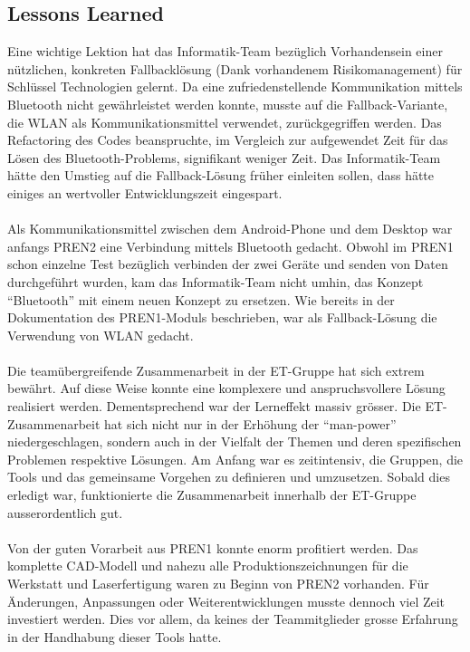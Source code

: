 \subsection{Lessons Learned}
Eine wichtige Lektion hat das Informatik-Team bezüglich Vorhandensein einer nützlichen, 
konkreten Fallbacklösung (Dank vorhandenem Risikomanagement) für Schlüssel Technologien gelernt. 
Da eine zufriedenstellende Kommunikation mittels Bluetooth nicht gewährleistet werden konnte, 
musste auf die Fallback-Variante, die WLAN als Kommunikationsmittel verwendet, zurückgegriffen werden. 
Das Refactoring des Codes beanspruchte, im Vergleich zur aufgewendet Zeit für das Lösen des Bluetooth-Problems, 
signifikant weniger Zeit. Das Informatik-Team hätte den Umstieg auf die Fallback-Lösung früher einleiten sollen, 
dass hätte einiges an wertvoller Entwicklungszeit eingespart.
\\
\\
Als Kommunikationsmittel zwischen dem Android-Phone und dem Desktop war anfangs PREN2 eine Verbindung 
mittels Bluetooth gedacht. Obwohl im PREN1 schon einzelne Test bezüglich verbinden der zwei Geräte und 
senden von Daten durchgeführt wurden, kam das Informatik-Team nicht umhin, das Konzept \enquote{Bluetooth} mit einem neuen 
Konzept zu ersetzen. Wie bereits in der Dokumentation des PREN1-Moduls beschrieben, war als Fallback-Lösung 
die Verwendung von WLAN gedacht. 
\\
\\
Die teamübergreifende Zusammenarbeit in der ET-Gruppe hat sich extrem bewährt. Auf diese Weise 
konnte eine komplexere und anspruchsvollere Lösung realisiert werden. Dementsprechend war der 
Lerneffekt massiv grösser. Die ET-Zusammenarbeit hat sich nicht nur in der Erhöhung der \enquote{man-power} 
niedergeschlagen, sondern auch in der Vielfalt der Themen und deren spezifischen Problemen respektive 
Lösungen. Am Anfang war es zeitintensiv, die Gruppen, die Tools und das gemeinsame Vorgehen zu 
definieren und umzusetzen. Sobald dies erledigt war, funktionierte die Zusammenarbeit innerhalb 
der ET-Gruppe ausserordentlich gut.
\\
\\
Von der guten Vorarbeit aus PREN1 konnte enorm profitiert werden. Das komplette CAD-Modell und 
nahezu alle Produktionszeichnungen für die Werkstatt und Laserfertigung waren zu Beginn von PREN2 vorhanden. 
Für Änderungen, Anpassungen oder Weiterentwicklungen musste dennoch viel Zeit investiert werden. 
Dies vor allem, da keines der Teammitglieder grosse Erfahrung in der Handhabung dieser Tools hatte. 
